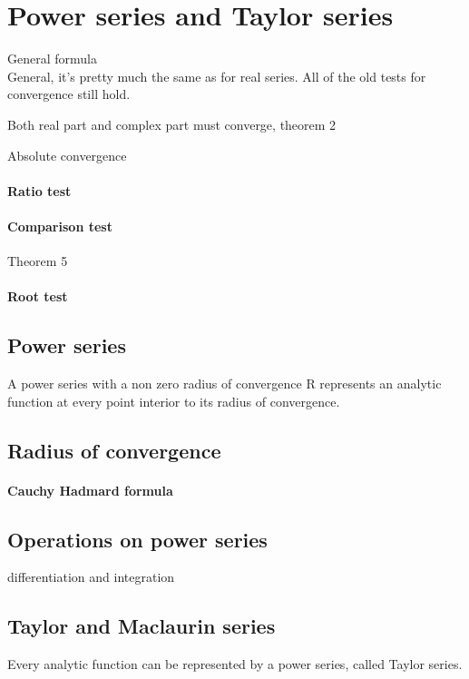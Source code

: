 \section{Power series and Taylor series}
General formula \\

General, it's pretty much the same as for real series. All of the old
tests for convergence still hold.

Both real part and complex part must converge, theorem 2

Absolute convergence

\paragraph{Ratio test}

\paragraph{Comparison test} Theorem 5

\paragraph{Root test}


\subsection{Power series}


A power series with a non zero radius of convergence R represents an
analytic function at every point interior to its radius of
convergence.

\subsection{Radius of convergence}

\paragraph{Cauchy Hadmard formula}

\subsection{Operations on power series}
differentiation and  integration



\subsection{Taylor and Maclaurin series}
Every analytic function can be represented by a power series, called
Taylor series.

